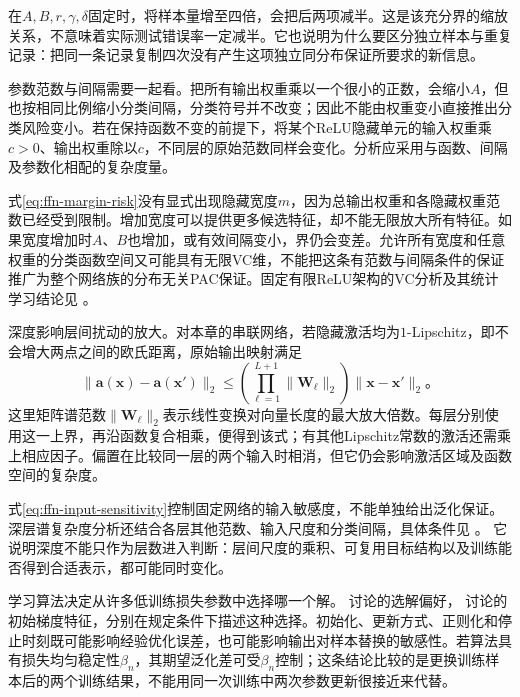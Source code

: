 在$A,B,r,\gamma,\delta$固定时，将样本量增至四倍，会把后两项减半。这是该充分界的缩放关系，不意味着实际测试错误率一定减半。它也说明为什么要区分独立样本与重复记录：把同一条记录复制四次没有产生这项独立同分布保证所要求的新信息。

参数范数与间隔需要一起看。把所有输出权重乘以一个很小的正数，会缩小$A$，但也按相同比例缩小分类间隔，分类符号并不改变；因此不能由权重变小直接推出分类风险变小。若在保持函数不变的前提下，将某个ReLU隐藏单元的输入权重乘$c>0$、输出权重除以$c$，不同层的原始范数同样会变化。分析应采用与函数、间隔及参数化相配的复杂度量。

式\eqref{eq:ffn-margin-risk}没有显式出现隐藏宽度$m$，因为总输出权重和各隐藏权重范数已经受到限制。增加宽度可以提供更多候选特征，却不能无限放大所有特征。如果宽度增加时$A$、$B$也增加，或有效间隔变小，界仍会变差。允许所有宽度和任意权重的分类函数空间又可能具有无限VC维，不能把这条有范数与间隔条件的保证推广为整个网络族的分布无关PAC保证。固定有限ReLU架构的VC分析及其统计学习结论见
。

深度影响层间扰动的放大。对本章的串联网络，若隐藏激活均为$1$-Lipschitz，即不会增大两点之间的欧氏距离，原始输出映射满足
\begin{equation}
  \lVert\bm{a}(\bm{x})-\bm{a}(\bm{x}')\rVert_2
  \leq
  \left(\prod_{\ell=1}^{L+1}\lVert\bm{W}_\ell\rVert_2\right)
  \lVert\bm{x}-\bm{x}'\rVert_2\text{。}
  \label{eq:ffn-input-sensitivity}
\end{equation}
这里矩阵谱范数$\lVert\bm{W}_\ell\rVert_2$表示线性变换对向量长度的最大放大倍数。每层分别使用这一上界，再沿函数复合相乘，便得到该式；有其他Lipschitz常数的激活还需乘上相应因子。偏置在比较同一层的两个输入时相消，但它仍会影响激活区域及函数空间的复杂度。

式\eqref{eq:ffn-input-sensitivity}控制固定网络的输入敏感度，不能单独给出泛化保证。深层谱复杂度分析还结合各层其他范数、输入尺度和分类间隔，具体条件见
。
它说明深度不能只作为层数进入判断：层间尺度的乘积、可复用目标结构以及训练能否得到合适表示，都可能同时变化。

学习算法决定从许多低训练损失参数中选择哪一个解。
讨论的选解偏好，
讨论的初始梯度特征，分别在规定条件下描述这种选择。初始化、更新方式、正则化和停止时刻既可能影响经验优化误差，也可能影响输出对样本替换的敏感性。若算法具有损失均匀稳定性$\beta_n$，其期望泛化差可受$\beta_n$控制；这条结论比较的是更换训练样本后的两个训练结果，不能用同一次训练中两次参数更新很接近来代替。

